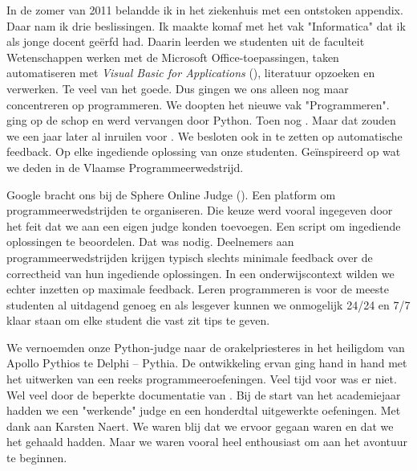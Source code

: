 
In de zomer van 2011 belandde ik in het ziekenhuis met een ontstoken appendix.
Daar nam ik drie beslissingen.
Ik maakte komaf met het vak "Informatica" dat ik als jonge docent geërfd had.
Daarin leerden we studenten uit de faculteit Wetenschappen werken met de Microsoft Office-toepassingen, taken automatiseren met \emph{Visual Basic for Applications} (), literatuur opzoeken en verwerken.
Te veel van het goede.
Dus gingen we ons alleen nog maar concentreren op programmeren.
We doopten het nieuwe vak "Programmeren".
 ging op de schop en werd vervangen door Python.
Toen nog .
Maar dat zouden we een jaar later al inruilen voor .
We besloten ook in te zetten op automatische feedback.
Op elke ingediende oplossing van onze studenten.
Geïnspireerd op wat we deden in de Vlaamse Programmeerwedstrijd.

Google bracht ons bij de Sphere Online Judge ().
Een platform om programmeerwedstrijden te organiseren.
Die keuze werd vooral ingegeven door het feit dat we aan  een eigen judge konden toevoegen.
Een script om ingediende oplossingen te beoordelen.
Dat was nodig.
Deelnemers aan programmeerwedstrijden krijgen typisch slechts minimale feedback over de correctheid van hun ingediende oplossingen.
In een onderwijscontext wilden we echter inzetten op maximale feedback.
Leren programmeren is voor de meeste studenten al uitdagend genoeg en als lesgever kunnen we onmogelijk 24/24 en 7/7 klaar staan om elke student die vast zit tips te geven.

We vernoemden onze Python-judge naar de orakelpriesteres in het heiligdom van Apollo Pythios te Delphi -- Pythia.
De ontwikkeling ervan ging hand in hand met het uitwerken van een reeks programmeeroefeningen.
Veel tijd voor  was er niet.
Wel veel  door de beperkte documentatie van .
Bij de start van het academiejaar hadden we een "werkende" judge en een honderdtal uitgewerkte oefeningen.
Met dank aan Karsten Naert.
We waren blij dat we ervoor gegaan waren en dat we het gehaald hadden.
Maar we waren vooral heel enthousiast om aan het avontuur te beginnen.

